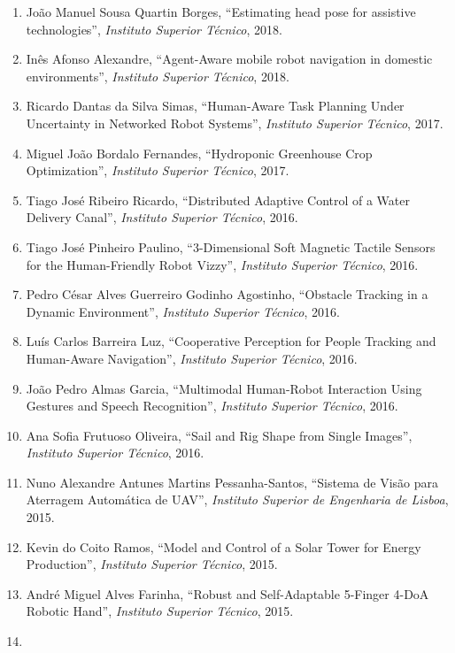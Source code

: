 \documentclass[
]{article}
\begin{document}
\begin{enumerate}
  João Miguel Vieira Cartucho, ``Robust Object Recognition Through
  Symbiotic Deep Learning in Mobile Robots'', \emph{Instituto Superior
  Técnico}, 2018.
\item
  João Manuel Sousa Quartin Borges, ``Estimating head pose for assistive
  technologies'', \emph{Instituto Superior Técnico}, 2018.
\item
  Inês Afonso Alexandre, ``Agent-Aware mobile robot navigation in
  domestic environments'', \emph{Instituto Superior Técnico}, 2018.
\item
  Ricardo Dantas da Silva Simas, ``Human-Aware Task Planning Under
  Uncertainty in Networked Robot Systems'', \emph{Instituto Superior
  Técnico}, 2017.
\item
  Miguel João Bordalo Fernandes, ``Hydroponic Greenhouse Crop
  Optimization'', \emph{Instituto Superior Técnico}, 2017.
\item
  Tiago José Ribeiro Ricardo, ``Distributed Adaptive Control of a Water
  Delivery Canal'', \emph{Instituto Superior Técnico}, 2016.
\item
  Tiago José Pinheiro Paulino, ``3-Dimensional Soft Magnetic Tactile
  Sensors for the Human-Friendly Robot Vizzy'', \emph{Instituto Superior
  Técnico}, 2016.
\item
  Pedro César Alves Guerreiro Godinho Agostinho, ``Obstacle Tracking in
  a Dynamic Environment'', \emph{Instituto Superior Técnico}, 2016.
\item
  Luís Carlos Barreira Luz, ``Cooperative Perception for People Tracking
  and Human-Aware Navigation'', \emph{Instituto Superior Técnico}, 2016.
\item
  João Pedro Almas Garcia, ``Multimodal Human-Robot Interaction Using
  Gestures and Speech Recognition'', \emph{Instituto Superior Técnico},
  2016.
\item
  Ana Sofia Frutuoso Oliveira, ``Sail and Rig Shape from Single
  Images'', \emph{Instituto Superior Técnico}, 2016.
\item
  Nuno Alexandre Antunes Martins Pessanha-Santos, ``Sistema de Visão
  para Aterragem Automática de UAV'', \emph{Instituto Superior de
  Engenharia de Lisboa}, 2015.
\item
  Kevin do Coito Ramos, ``Model and Control of a Solar Tower for Energy
  Production'', \emph{Instituto Superior Técnico}, 2015.
\item
  André Miguel Alves Farinha, ``Robust and Self-Adaptable 5-Finger 4-DoA
  Robotic Hand'', \emph{Instituto Superior Técnico}, 2015.
\item

\end{enumerate}
\end{document}
